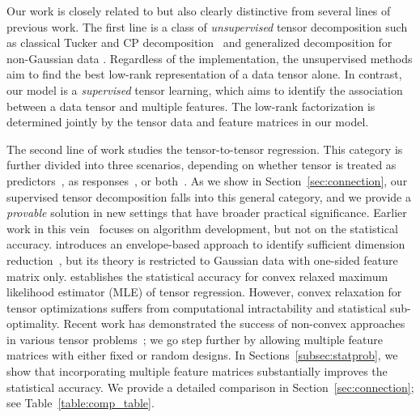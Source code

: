 \documentclass[12pt]{article}
\theoremstyle{definition}
\theoremstyle{definition}
\begin{document}
 
Our work is closely related to but also clearly distinctive from several lines of previous work. {The first line is a class of}\label{change:firstline} \textit{unsupervised} tensor decomposition such as classical Tucker and CP decomposition~\citep{de2000multilinear, kolda2009tensor} and generalized decomposition for non-Gaussian data \citep{chi2012tensors, tarzanagh2019regularized,hong2020generalized,  li2020generalized}. {  Regardless of the implementation, the unsupervised methods aim to find the best low-rank representation of a data tensor alone. In contrast, our model is a \textit{supervised} tensor learning, which aims to identify the association between a data tensor and multiple features. The low-rank factorization is determined jointly by the tensor data and feature matrices in our model.}

The second line of work studies the tensor-to-tensor regression. {  This category is further divided into three scenarios, depending on whether tensor is treated as predictors~\citep{zhou2013tensor,raskutti2019convex,han2020optimal}, as responses~\citep{li2017parsimonious,sun2017store,zhang2018network,lock2018supervised,luo2018leveraging}, or both~\citep{lock2018tensor,gahrooei2020multiple}. As we show in Section~\ref{sec:connection}, our supervised tensor decomposition falls into this general category, and we provide a \emph{provable} solution in new settings that have broader practical significance. Earlier work in this vein~\citep{lock2018tensor,lock2018supervised,gahrooei2020multiple,li2020generalized} focuses on algorithm development, but not on the statistical accuracy. \cite{li2017parsimonious} introduces an envelope-based approach to identify sufficient dimension reduction~\citep{adragni2009sufficient}, but its theory is restricted to Gaussian data with one-sided feature matrix only. \cite{raskutti2019convex} establishes the statistical accuracy for convex relaxed maximum likelihood estimator (MLE) of tensor regression. However, convex relaxation for tensor optimizations suffers from computational intractability and statistical sub-optimality. Recent work has demonstrated the success of non-convex approaches in various tensor problems~\citep{sun2017store,zhang2018network,raskutti2019convex,han2020optimal}; we go step further by allowing multiple feature matrices with either fixed or random designs. In Sections~\ref{subsec:statprob}, we show that incorporating multiple feature matrices substantially improves the statistical accuracy. We provide a detailed comparison in Section~\ref{sec:connection}; see Table~\ref{table:comp_table}.}
\end{document}

